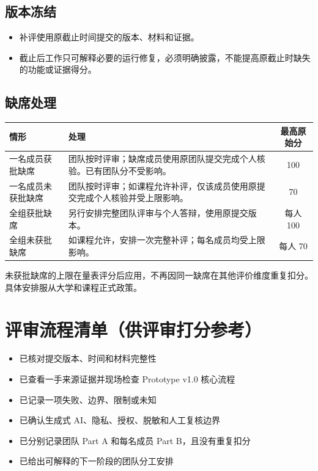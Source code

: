 \documentclass[11pt]{article}
\newcommand{\formaltable}{%
  \small
  \setlength{\tabcolsep}{5pt}%
  \renewcommand{\arraystretch}{1.2}%
  \setlength{\arrayrulewidth}{0.4pt}%
}
\renewcommand{\arraystretch}{1.2}
\begin{document}
\subsection{版本冻结}
\begin{itemize}
  \item 补评使用原截止时间提交的版本、材料和证据。
  \item 截止后工作只可解释必要的运行修复，必须明确披露，不能提高原截止时缺失的功能或证据得分。
\end{itemize}

\subsection{缺席处理}
\begin{center}
\formaltable
\begin{tabularx}{\textwidth}{|l|Y|c|}
\hline
\textbf{情形} & \textbf{处理} & \textbf{最高原始分} \\ \hline
一名成员获批缺席 & 团队按时评审；缺席成员使用原团队提交完成个人核验。已有团队分不受影响。 & 100 \\ \hline
一名成员未获批缺席 & 团队按时评审；如课程允许补评，仅该成员使用原提交完成个人核验并受上限影响。 & 70 \\ \hline
全组获批缺席 & 另行安排完整团队评审与个人答辩，使用原提交版本。 & 每人 100 \\ \hline
全组未获批缺席 & 如课程允许，安排一次完整补评；每名成员均受上限影响。 & 每人 70 \\ \hline
\end{tabularx}
\end{center}

\noindent 未获批缺席的上限在量表评分后应用，不再因同一缺席在其他评价维度重复扣分。具体安排服从大学和课程正式政策。

\section{评审流程清单（供评审打分参考）}
\begin{itemize}[label=$\mdlgwhtsquare$]
  \item 已核对提交版本、时间和材料完整性
  \item 已查看一手来源证据并现场检查 Prototype v1.0 核心流程
  \item 已记录一项失败、边界、限制或未知
  \item 已确认生成式 AI、隐私、授权、脱敏和人工复核边界
  \item 已分别记录团队 Part A 和每名成员 Part B，且没有重复扣分
  \item 已给出可解释的下一阶段的团队分工安排
\end{itemize}
\end{document}
